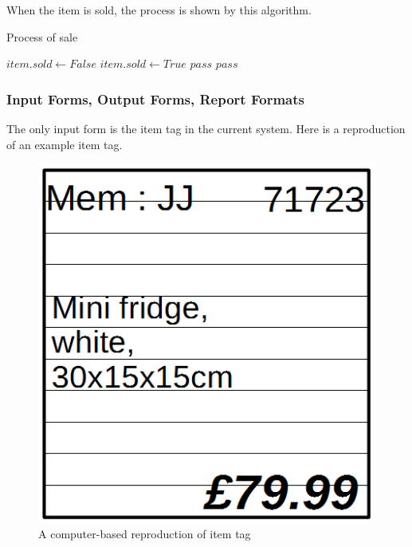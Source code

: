 When the item is sold, the process is shown by this algorithm.

\begin{algorithm}[H]
	\caption{Process of sale}
\begin{algorithmic}[2]
\State $item.sold \gets False$
\EndFunction
{}
\State $item.sold \gets True$
\Else 
\State $pass$
\EndIf
\Else 
\State $pass$
\EndIf
\EndWhile
\end{algorithmic}
\end{algorithm}


\subsubsection{Input Forms, Output Forms, Report Formats}
The only input form is the item tag in the current system. Here is a reproduction of an example item tag.

\begin{figure}[H]
    \includegraphics[width=\textwidth]{ExampleItemTag.png}
    \caption{A computer-based reproduction of item tag} \label{fig:ItemTag}
\end{figure}

